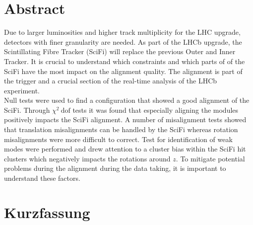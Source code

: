 \chapter*{Abstract}
\label{sec:abstract}

Due to larger luminosities and higher track multiplicity for the LHC upgrade, detectors with finer granularity are needed.
As part of the LHCb upgrade, the Scintillating Fibre Tracker (SciFi) will replace the previous Outer and Inner Tracker. It is crucial to understand which constraints and which parts of of the SciFi have the most impact on the alignment quality.
The alignment is part of the trigger and a crucial section of the real-time analysis of the LHCb experiment.
\\
Null tests were used to find a configuration that showed a good alignment of the SciFi.
Through $\chi^2 \ \text{dof}$ tests it was found that especially aligning the modules positively impacts the SciFi alignment.
A number of misalignment tests showed that translation misalignments can be handled by the SciFi whereas rotation misalignments were more difficult to correct.
Test for identification of weak modes were performed and drew attention to a cluster bias within the SciFi hit clusters which negatively impacts the rotations around $z$.
To mitigate potential problems during the alignment during the data taking, it is important to understand these factors.

{\let\clearpage\relax \chapter*{Kurzfassung}}
\label{sec:kurzf}

